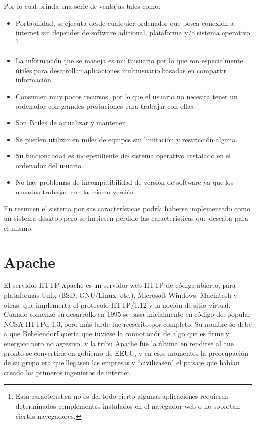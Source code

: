 Por lo cual brinda una serie de ventajas tales como:

\begin{itemize}
    \item Portabilidad, se ejecuta desde cualquier ordenador que posea conexión a internet sin depender de software adicional, plataforma y/o sistema operativo. \footnote{Esta característica no es del todo cierto algunas aplicaciones requieren determinados complementos instalados en el navegador web o no soportan ciertos navegadores.}
    \item La información que se maneja es multiusuario por lo que son especialmente útiles para         desarrollar aplicaciones multiusuario basadas en compartir información.
    \item Consumen muy pocos recursos, por lo que el usuario no necesita tener un ordenador con         grandes prestaciones para trabajar con ellas.
    \item Son fáciles de actualizar y mantener.
    \item Se pueden utilizar en miles de equipos sin limitación y restricción alguna.
    \item Su funcionalidad es independiente del sistema operativo Instalado en el ordenador del  usuario.
    \item No hay problemas de incompatibilidad de versión de software ya que los usuarios trabajan con la misma versión.
\end{itemize}

En resumen el sistema por sus características podría haberse implementado como un sistema desktop pero se hubiesen perdido las características que deseaba para el mismo. 


\section{Apache}

El servidor HTTP Apache es un servidor web HTTP de código abierto, para plataformas Unix (BSD, GNU/Linux, etc.), Microsoft Windows, Macintosh y otras, que implementa el protocolo HTTP/1.12 y la noción de sitio virtual. Cuando comenzó su desarrollo en 1995 se basa inicialmente en código del popular NCSA HTTPd 1.3, pero más tarde fue reescrito por completo. Su nombre se debe a que Behelendorf quería que tuviese la connotación de algo que es firme y enérgico pero no agresivo, y la tribu Apache fue la última en rendirse al que pronto se convertiría en gobierno de EEUU, y en esos momentos la preocupación de su grupo era que llegasen las empresas y ``civilizasen" el paisaje que habían creado los primeros ingenieros de internet.\\[0.1cm]

